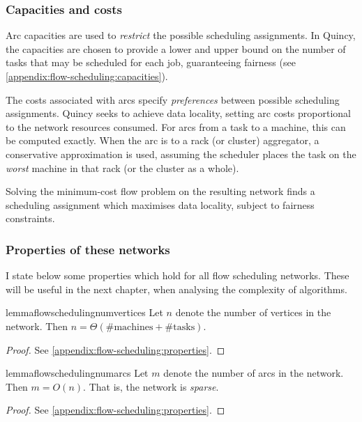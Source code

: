 \subsubsection{Capacities and costs}
Arc capacities are used to \emph{restrict} the possible scheduling assignments. In Quincy, the capacities are chosen to provide a lower and upper bound on the number of tasks that may be scheduled for each job, guaranteeing fairness (see \cref{appendix:flow-scheduling:capacities}).

The costs associated with arcs specify \emph{preferences} between possible scheduling assignments. Quincy seeks to achieve data locality, setting arc costs proportional to the network resources consumed. For arcs from a task to a machine, this can be computed exactly. When the arc is to a rack (or cluster) aggregator, a conservative approximation is used, assuming the scheduler places the task on the \emph{worst} machine in that rack (or the cluster as a whole).

Solving the minimum-cost flow problem on the resulting network finds a scheduling assignment which maximises data locality, subject to fairness constraints.

\subsubsection{Properties of these networks}


I state below some properties which hold for all flow scheduling networks. These will be useful in the next chapter, when analysing the complexity of algorithms. \\

\begin{restatable}{lemma}{flowschedulingnumvertices}
\label{lemma:network-num-vertices}
Let $n$ denote the number of vertices in the network. Then $n = \Theta\left(\text{\# machines} + \text{\# tasks}\right)$.
\end{restatable}
\begin{proof}
See \cref{appendix:flow-scheduling:properties}.
\end{proof}

\begin{restatable}{lemma}{flowschedulingnumarcs} 
\label{lemma:network-num-arcs}
Let $m$ denote the number of arcs in the network. Then $m = O(n)$. That is, the network is \emph{sparse}.
\end{restatable}
\begin{proof}
See \cref{appendix:flow-scheduling:properties}.
\end{proof}

